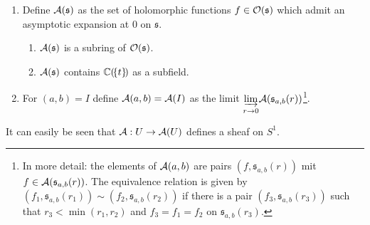 \begin{defn}
  \begin{enumerate}
    \item Define $\mathcal{A}(\mathfrak{s})$ as the set of holomorphic functions
      $f\in\mathcal{O}(\mathfrak{s})$ which admit an asymptotic expansion at $0$ on
      $\mathfrak{s}$.
      \begin{s-rem}
        \begin{enumerate}
          \item
            $\mathcal{A}(\mathfrak{s})$ is a subring of $\mathcal{O}(\mathfrak{s})$.
          \item
            $\mathcal{A}(\mathfrak{s})$ contains $\mathbb{C}(\!\{t\}\!)$ as a subfield.
        \end{enumerate}
      \end{s-rem}
    \item
      For $(a,b)=I$ define $\mathcal{A}(a,b)=\mathcal{A}(I)$ as the limit
      $\underset{r\to0}{\underrightarrow{\lim}}
      \mathcal{A}(\mathfrak{s}_{a,b}(r))$\footnote{In more detail: the
        elements of $\mathcal{A}(a,b)$ are pairs $(f,\mathfrak{s}_{a,b}(r))$ mit
        $f\in\mathcal{A}(\mathfrak{s}_{a,b}(r))$. The equivalence relation is given by
        $(f_1,\mathfrak{s}_{a,b}(r_1))\sim(f_2,\mathfrak{s}_{a,b}(r_2))$ if
      there is a pair $(f_3,\mathfrak{s}_{a,b}(r_3))$ such that
      $r_3<\min(r_1,r_2)$ and $f_3=f_1=f_2$ on $\mathfrak{s}_{a,b}(r_3)$.}.
  \end{enumerate}
\end{defn}
It can easily be seen that $\mathcal{A}:U\to\mathcal{A}(U)$ defines a sheaf on $S^1$.

